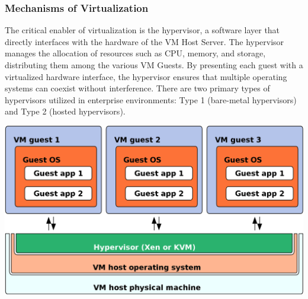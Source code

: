 \subsubsection[Mechanisms of Virtualization]{Mechanisms of Virtualization}
The critical enabler of virtualization is the hypervisor, a software layer that directly interfaces with the hardware of the VM Host Server. The hypervisor manages the allocation of resources such as CPU, memory, and storage, distributing them among the various VM Guests. By presenting each guest with a virtualized hardware interface, the hypervisor ensures that multiple operating systems can coexist without interference. There are two primary types of hypervisors utilized in enterprise environments: Type 1 (bare-metal hypervisors) and Type 2 (hosted hypervisors).
\begin{center}
    \centering
    \includegraphics[width=1\textwidth]{Images/VirtualizationSchema.png}
     \cite{Source}
    \label{fig:source}
\end{center}

